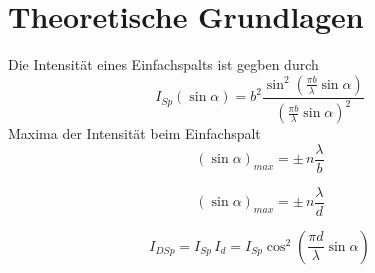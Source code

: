 \section{Theoretische Grundlagen}
Die Intensität eines Einfachspalts ist gegben durch
\begin{equation}
I_{Sp}(\sin \alpha) = b^2 \frac{\sin^2 \left( \frac{\pi b}{\lambda} \sin \alpha \right)}{\left( \frac{\pi b}{\lambda} \sin\alpha \right)^2}
\end{equation}
Maxima der Intensität beim Einfachspalt
\begin{equation}
\left( \sin \alpha \right)_{max} = \pm \, n \frac{\lambda}{b} 
\label{max_b}
\end{equation}

\begin{equation}
\left( \sin \alpha \right)_{max} = \pm \, n \frac{\lambda}{d}
\label{max_d}
\end{equation}

\begin{equation}
I_{DSp} = I_{Sp} \, I_{d} = I_{Sp} \cos^2 \left( \frac{\pi d}{\lambda} \sin \alpha \right)
\end{equation}